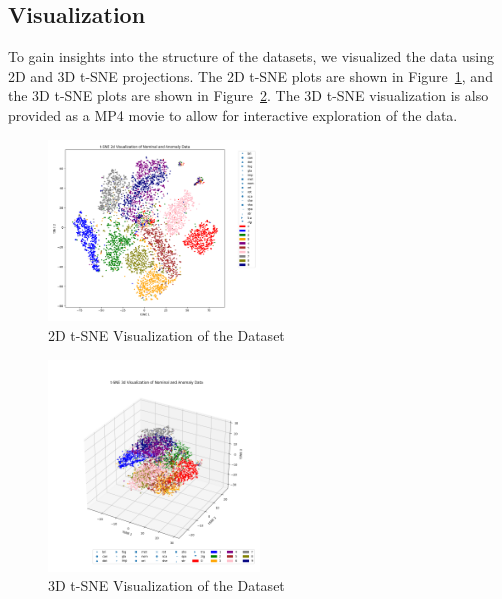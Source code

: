 \subsection{Visualization}
To gain insights into the structure of the datasets, we visualized the data using 2D and 3D t-SNE projections. The 2D t-SNE plots are shown in Figure~\ref{fig:tsne_2d}, and the 3D t-SNE plots are shown in Figure~\ref{fig:tsne_3d}. The 3D t-SNE visualization is also provided as a MP4 movie to allow for interactive exploration of the data.

\begin{figure}[htbp]
\centering
\includegraphics[width=0.5\textwidth]{resources/images/tsne_2d.png}
\caption{2D t-SNE Visualization of the Dataset}
\label{fig:tsne_2d}
\end{figure}

\begin{figure}[htbp]
\centering
\includegraphics[width=0.5\textwidth]{resources/images/tsne_3d.png}
\caption{3D t-SNE Visualization of the Dataset}
\label{fig:tsne_3d}
\end{figure}